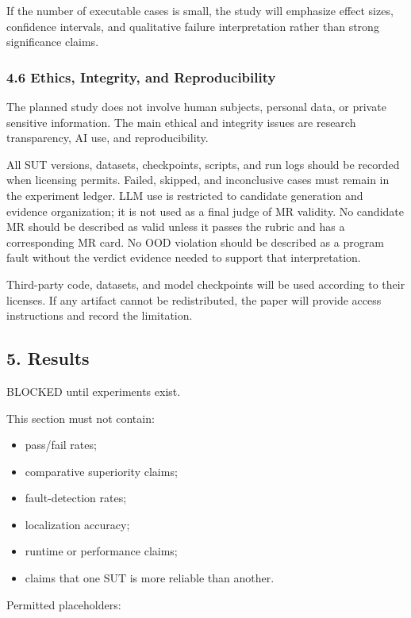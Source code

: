 If the number of executable cases is small, the study will emphasize
effect sizes, confidence intervals, and qualitative failure
interpretation rather than strong significance claims.

\subsubsection{4.6 Ethics, Integrity, and
Reproducibility}\label{ethics-integrity-and-reproducibility}

The planned study does not involve human subjects, personal data, or
private sensitive information. The main ethical and integrity issues are
research transparency, AI use, and reproducibility.

All SUT versions, datasets, checkpoints, scripts, and run logs should be
recorded when licensing permits. Failed, skipped, and inconclusive cases
must remain in the experiment ledger. LLM use is restricted to candidate
generation and evidence organization; it is not used as a final judge of
MR validity. No candidate MR should be described as valid unless it
passes the rubric and has a corresponding MR card. No OOD violation
should be described as a program fault without the verdict evidence
needed to support that interpretation.

Third-party code, datasets, and model checkpoints will be used according
to their licenses. If any artifact cannot be redistributed, the paper
will provide access instructions and record the limitation.

\subsection{5. Results}\label{results-1}

BLOCKED until experiments exist.

This section must not contain:

\begin{itemize}
\tightlist
\item
  pass/fail rates;
\item
  comparative superiority claims;
\item
  fault-detection rates;
\item
  localization accuracy;
\item
  runtime or performance claims;
\item
  claims that one SUT is more reliable than another.
\end{itemize}

Permitted placeholders:

